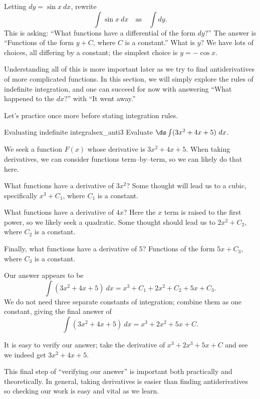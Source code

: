 Letting $dy = \sin x\ dx$,  rewrite 
$$\int \sin x \ dx \quad \text{as}\quad \int  dy.$$
This is asking: ``What functions have a differential of the form $dy$?'' The answer is ``Functions of the form $y+C$, where $C$ is a constant.'' What is $y$? We have lots of choices, all differing by a constant; the simplest choice is $y = -\cos x$.

Understanding all of this is more important later as we try to find antiderivatives of more complicated functions. In this section, we will simply explore the rules of indefinite integration, and one can succeed for now with answering ``What happened to the $dx$?'' with ``It went away.''



Let's practice once more before stating integration rules.\\

\begin{example}{Evaluating indefinite integrals}{ex_anti3}{
Evaluate $\ds \int (3x^2 + 4x+5)\ dx$.}
\end{example}

\begin{solution}
{We seek a function $F(x)$ whose derivative is $3x^2+4x+5$. When taking derivatives, we can consider functions term--by--term, so we can likely do that here.

What functions have a derivative of $3x^2$? Some thought will lead us to a cubic, specifically $x^3+C_1$, where $C_1$ is a constant. 

What functions have a derivative of $4x$? Here the $x$ term is raised to the first power, so we likely seek a quadratic. Some thought should lead us to $2x^2+C_2$, where $C_2$ is a constant.

Finally, what functions have a derivative of $5$? Functions of the form $5x+C_3$, where $C_3$ is a constant.

Our answer appears to be 
$$\int (3x^2+4x+5)\ dx = x^3+C_1+2x^2+C_2+5x+C_3.$$ We do not need three separate constants of integration; combine them as one constant, giving the final answer of 
$$\int (3x^2+4x+5)\ dx = x^3+2x^2+5x+C.$$

It is easy to verify our answer; take the derivative of $x^3+2x^3+5x+C$ and see we indeed get $3x^2+4x+5$.
}
\end{solution}


This final step of ``verifying our answer'' is important both practically and theoretically. In general, taking derivatives is easier than finding antiderivatives so checking our work is easy and vital as we learn.

